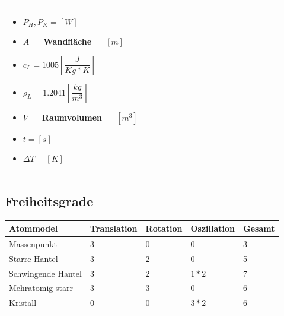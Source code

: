 \begin{table}[h!]
\begin{center}
\begin{tabular}{ | m{10cm} | m{8cm}  | }
\begin{itemize}
			\item $P_{H},P_{K}=[W]$
			\item $A=$ Wandfläche $=[m]$
			\item $c_{L}=1005[\dfrac{J}{Kg*K}]$
			\item $\rho_{L}=1.2041[\dfrac{kg}{m^{3}}]$
			\item $V=$ Raumvolumen $=[m^{3}]$
			\item $t=[s]$
			\item $\Delta T=[K]$
		\end{itemize}
		\\ \hline
	\end{tabular}
\end{center}
\end{table}

\newpage

\subsection{Freiheitsgrade}				%
\begin{table}[h!]
	
	\begin{tabular}{|m{3cm}|m{3cm}|m{3cm}|m{3cm}|m{3cm}|}
		\hline 
	\textbf{Atommodel}	& \textbf{Translation} & \textbf{Rotation}  & \textbf{Oszillation} & \textbf{Gesamt}    \\ 
		\hline 
		Massenpunkt & 3 & 0 & 0 & 3   \\ 
		\hline 
		Starre Hantel& 3 & 2 & 0 & 5   \\ 
		\hline 
		Schwingende Hantel& 3 & 2 & $1*2$ & 7   \\ 
		\hline 
		Mehratomig starr& 3 & 3 & 0 & 6    \\ 
		\hline 
		Kristall& 0 & 0 & $3*2$ & 6    \\ 
		\hline 
	\end{tabular} 
\end{table}





